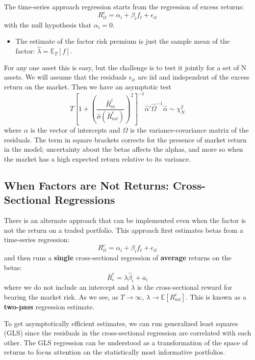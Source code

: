 \documentclass[
]{book}
\providecommand{\tightlist}{%
  \setlength{\itemsep}{0pt}\setlength{\parskip}{0pt}}
\begin{document}
The time-series approach regression starts from the regression of excess returns:
\[
R_{it}^{e}=\alpha_{i}+\beta_{i}f_t+\epsilon_{it}
\]
with the null hypothesis that \(\alpha_i = 0\).

\begin{itemize}
\tightlist
\item
  The estimate of the factor risk premium is just the sample mean of the factor: \(\hat{\lambda} = \mathbb{E}_T[f]\).
\end{itemize}

For any one asset this is easy, but the challenge is to test it jointly for a set of N assets. We will assume that the residuals \(\epsilon_{it}\) are iid and independent of the excess return on the market. Then we have an asymptotic test
\[
T\left[1+\left(\frac{\bar{R}_{m}^{e}}{\hat{\sigma}\left(\bar{R}_{mt}^{e}\right)}\right)^{2}\right]^{-1}\hat{\alpha}'\hat{\Omega}^{-1}\hat{\alpha}\sim\chi_{N}^{2}
\]
where \(\alpha\) is the vector of intercepts and \(\Omega\) is the variance-covariance matrix of the residuals. The term in square brackets corrects for the presence of market return in the model; uncertainty about the betas affects the alphas, and more so when the market has a high expected return relative to its variance.

\hypertarget{when-factors-are-not-returns-cross-sectional-regressions}{%
\subsection{When Factors are Not Returns: Cross-Sectional Regressions}\label{when-factors-are-not-returns-cross-sectional-regressions}}

There is an alternate approach that can be implemented even when the factor is not the return on a traded portfolio. This approach first estimates betas from a time-series regression:
\[
R_{it}^{e}=\alpha_{i}+\beta_{i}f_t+\epsilon_{it}
\]
and then runs a \textbf{single} cross-sectional regression of \textbf{average} returns on the betas:
\[
\bar{R}_{i}^{e}=\lambda\hat{\beta}_{i}+a_{i}
\]
where we do not include an intercept and \(\lambda\) is the cross-sectional reward for bearing the market risk. As we see, as \(T\to\infty\), \(\lambda\to\mathbb{E}[R_{mt}^e]\). This is known as a \textbf{two-pass} regression estimate.

To get asymptotically efficient estimates, we can run generalized least squares (GLS) since the residuals in the cross-sectional regression are correlated with each other. The GLS regression can be understood as a transformation of the space of returns to focus attention on the statistically most informative portfolios.
\end{document}
